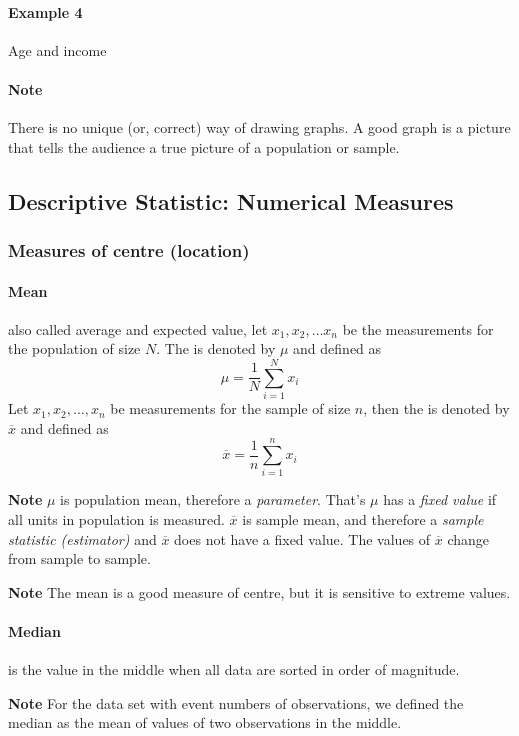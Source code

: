 \documentclass[11pt]{article}
\begin{document}
	\paragraph{Example 4} Age and income
	
	\paragraph{Note} There is no unique (or, correct) way of drawing graphs. A good graph is a picture that tells the audience a true picture of a population or sample.
	
	\subsection{Descriptive Statistic: Numerical Measures}
	\subsubsection{Measures of centre (location)}
	\paragraph{Mean} also called average and expected value, let $x_1, x_2, \dots x_n$ be the measurements for the population of size $N$. The  is denoted by $\mu$ and defined as 
	\[
		\mu = \frac{1}{N} \sum_{i=1}^N x_i
	\] Let $x_1, x_2, \dots, x_n$ be measurements for the sample of size $n$, then the  is denoted by $\overline{x}$ and defined as
	\[
		\overline{x} = \frac{1}{n} \sum_{i=1}^n x_i
	\]
	
	\textbf{Note} $\mu$ is population mean, therefore a \emph{parameter}. That's $\mu$ has a \emph{fixed value} if all units in population is measured. $\overline{x}$ is sample mean, and therefore a \emph{sample statistic (estimator)} and $\overline{x}$ does not have a fixed value. The values of $\overline{x}$ change from sample to sample.
	
	\textbf{Note} The mean is a good measure of centre, but it is sensitive to extreme values.
	
	\paragraph{Median} is the value in the middle when all data are sorted in order of magnitude.
	
	\textbf{Note} For the data set with event numbers of observations, we defined the median as the mean of values of two observations in the middle.
	
\end{document}
